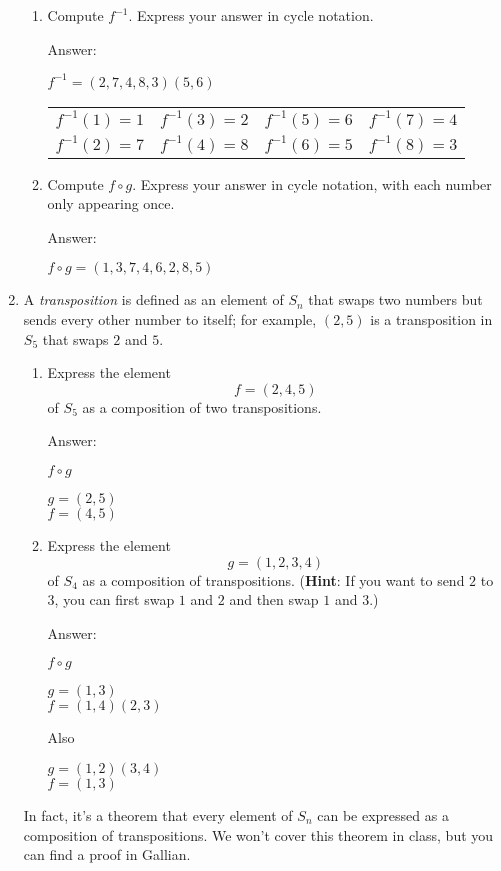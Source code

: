 \documentclass[11pt,twoside]{article}
\begin{document}
\begin{enumerate}
\begin{enumerate}[label=(\alph*)]
\item Compute $f^{-1}$.  Express your answer in cycle notation.

{\color{red}Answer:}

$f^{-1} = (2,7,4,8,3)(5,6)$

\begin{tabular}{ r r r r }
$f^{-1}(1) = 1$	&	$f^{-1}(3) = 2$	&	$f^{-1}(5) = 6$	&	$f^{-1}(7) = 4$\\
$f^{-1}(2) = 7$	&	$f^{-1}(4) = 8$	&	$f^{-1}(6) = 5$	&	$f^{-1}(8) = 3$
\end{tabular}

\item Compute $f \circ g$.  Express your answer in cycle notation, with each number only appearing once.

{\color{red}Answer:}

$f\circ g = (1,3,7,4,6,2,8,5)$
\end{enumerate}

\vspace{0.5cm}

\item A {\it transposition} is defined as an element of $S_n$ that swaps two numbers but sends every other number to itself; for example, $(2,5)$ is a transposition in $S_5$ that swaps $2$ and $5$.
\begin{enumerate}[label=(\alph*)]
\item Express the element
\[f = (2,4,5)\]
of $S_5$ as a composition of two transpositions.

{\color{red}Answer:}

$f\circ g$

$g = (2,5)$\\
$f = (4,5)$

\item Express the element
\[g = (1,2,3,4)\]
of $S_4$ as a composition of transpositions.  ({\bf Hint}: If you want to send $2$ to $3$, you can first swap $1$ and $2$ and then swap $1$ and $3$.)

{\color{red}Answer:}

$f\circ g$

$g = (1,3)$\\
$f = (1,4)(2,3)$

Also

$g = (1,2)(3,4)$\\
$f = (1,3)$

\end{enumerate}
In fact, it's a theorem that every element of $S_n$ can be expressed as a composition of transpositions.  We won't cover this theorem in class, but you can find a proof in Gallian.


\end{enumerate}
\end{document}
